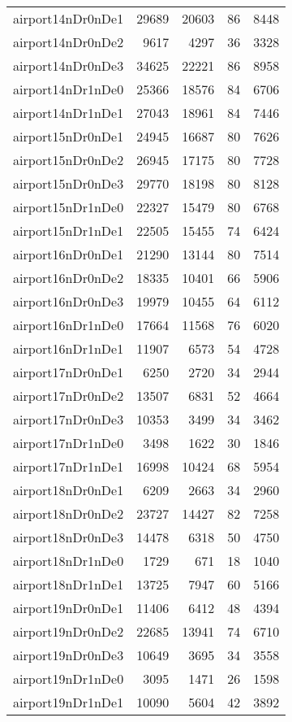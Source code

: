 \begin{longtable}{lrrrr}
airport14nDr0nDe1 & 29689 & 20603 & 86 & 8448 \\
airport14nDr0nDe2 & 9617 & 4297 & 36 & 3328 \\
airport14nDr0nDe3 & 34625 & 22221 & 86 & 8958 \\
airport14nDr1nDe0 & 25366 & 18576 & 84 & 6706 \\
airport14nDr1nDe1 & 27043 & 18961 & 84 & 7446 \\
airport15nDr0nDe1 & 24945 & 16687 & 80 & 7626 \\
airport15nDr0nDe2 & 26945 & 17175 & 80 & 7728 \\
airport15nDr0nDe3 & 29770 & 18198 & 80 & 8128 \\
airport15nDr1nDe0 & 22327 & 15479 & 80 & 6768 \\
airport15nDr1nDe1 & 22505 & 15455 & 74 & 6424 \\
airport16nDr0nDe1 & 21290 & 13144 & 80 & 7514 \\
airport16nDr0nDe2 & 18335 & 10401 & 66 & 5906 \\
airport16nDr0nDe3 & 19979 & 10455 & 64 & 6112 \\
airport16nDr1nDe0 & 17664 & 11568 & 76 & 6020 \\
airport16nDr1nDe1 & 11907 & 6573 & 54 & 4728 \\
airport17nDr0nDe1 & 6250 & 2720 & 34 & 2944 \\
airport17nDr0nDe2 & 13507 & 6831 & 52 & 4664 \\
airport17nDr0nDe3 & 10353 & 3499 & 34 & 3462 \\
airport17nDr1nDe0 & 3498 & 1622 & 30 & 1846 \\
airport17nDr1nDe1 & 16998 & 10424 & 68 & 5954 \\
airport18nDr0nDe1 & 6209 & 2663 & 34 & 2960 \\
airport18nDr0nDe2 & 23727 & 14427 & 82 & 7258 \\
airport18nDr0nDe3 & 14478 & 6318 & 50 & 4750 \\
airport18nDr1nDe0 & 1729 & 671 & 18 & 1040 \\
airport18nDr1nDe1 & 13725 & 7947 & 60 & 5166 \\
airport19nDr0nDe1 & 11406 & 6412 & 48 & 4394 \\
airport19nDr0nDe2 & 22685 & 13941 & 74 & 6710 \\
airport19nDr0nDe3 & 10649 & 3695 & 34 & 3558 \\
airport19nDr1nDe0 & 3095 & 1471 & 26 & 1598 \\
airport19nDr1nDe1 & 10090 & 5604 & 42 & 3892 \\

\end{longtable}
